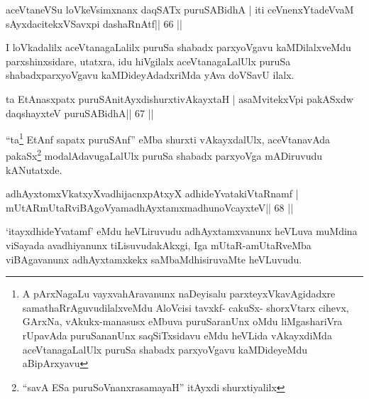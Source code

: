 

\begin{shl}
aceVtaneVSu loVkeV\s simxnanx daqSATx puruSABidhA |
iti ceVnenxYtadeVvaM sAyxdacitekxVSavxpi dashaRnAtf\hfill || 66 ||
\end{shl}

\begin{artha}
I loVkadalilx aceVtanagaLalilx puruSa shabadx parxyoVgavu kaMDilalxveMdu parxshinxsidare, utatxra, idu hiVgilalx aceVtanagaLalUlx puruSa shabadxparxyoVgavu kaMDideyAdadxriMda yAva doVSavU ilalx.
\end{artha}



\begin{shl}
ta EtAnasxpatx puruSAnitAyxdishurxtivAkayxtaH |
asaMvitekxV\s pi pakASxdw daqshayxteV puruSABidhA\hfill || 67 ||
\end{shl}

\begin{artha}
``ta\footnote{A pArxNagaLu vayxvahAravanunx naDeyisalu
  parxteyxVkavAgidadxre samathaRrAguvudilalxveMdu AloVcisi tavxkf-
  cakuSx- shorxVtarx cihevx, GArxNa, vAkukx-manasusx eMbuva
  puruSaranUnx oMdu liMgashariVra rUpavAda puruSananUnx
  saqSiTxsidavu eMdu heVLida vAkayxdiMda aceVtanagaLalUlx puruSa
  shabadx parxyoVgavu kaMDideyeMdu aBipArxyavu} EtAnf sapatx puruSAnf'' eMba shurxti vAkayxdalUlx,
  aceVtanavAda pakaSx\footnote{``savA ESa puruSoV\s nanxrasamayaH''
  itAyxdi shurxtiyalilx} modalAdavugaLalUlx puruSa shabadx
  parxyoVga mADiruvudu kANutatxde.
\end{artha}



\begin{shl}
adhAyxtomxVkatxyXvadhijacnxpAtxyX adhideYvatakiVtaRnamf |
mUtARmUtaRviBAgoV\s yamadhAyxtamxmadhunoVcayxteV\hfill || 68 ||
\end{shl}

\begin{artha}
`itayxdhideYvatamf' eMdu heVLiruvudu adhAyxtamxvanunx heVLuva muMdina  viSayada avadhiyanunx tiLisuvudakAkxgi, Iga mUtaR-amUtaRveMba viBAgavanunx adhAyxtamxkekx saMbaMdhisiruvaMte heVLuvudu.
\end{artha}

